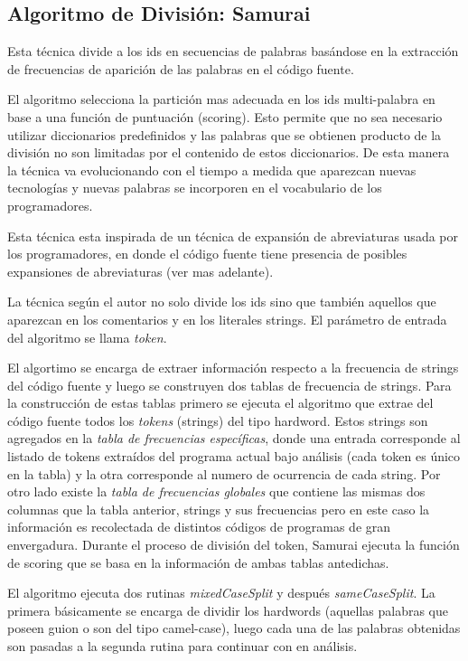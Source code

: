 \documentclass[12pt]{report}
\begin{document}
\subsection{Algoritmo de División: Samurai}

Esta técnica divide a los ids en secuencias de palabras basándose en la extracción de frecuencias de aparición de las palabras en el código fuente\cite{EHPV09}. 

El algoritmo selecciona la partición mas adecuada en los ids multi-palabra en base a una función de puntuación (scoring). Esto permite que no sea necesario utilizar diccionarios predefinidos y las palabras que se obtienen producto de la división no son limitadas por el contenido de estos diccionarios. De esta manera la técnica va evolucionando con el tiempo a medida que aparezcan nuevas tecnologías y nuevas palabras se incorporen en el vocabulario de los programadores.

Esta técnica esta inspirada de un técnica de expansión de abreviaturas usada por los programadores, en donde el código fuente tiene presencia de posibles expansiones de abreviaturas (ver mas adelante).%

La técnica según el autor\cite{EHPV09} no solo divide los ids sino que también aquellos que aparezcan en los comentarios y en los literales strings. El parámetro de entrada del algoritmo se llama \textit{token}.

El algortimo se encarga de extraer información respecto a la frecuencia de strings del código fuente y luego se construyen dos tablas de frecuencia de strings. Para la construcción de estas tablas primero se ejecuta el algoritmo que extrae del código fuente todos los \textit{tokens} (strings) del tipo hardword. Estos strings son agregados en la \textit{tabla de frecuencias específicas}, donde una entrada corresponde al listado de tokens extraídos del programa actual bajo análisis (cada token es único en la tabla) y la otra corresponde al numero de ocurrencia de cada string. Por otro lado existe la \textit{tabla de frecuencias globales} que contiene las mismas dos columnas que la tabla anterior, strings y sus frecuencias pero en este caso la información es recolectada de distintos códigos de programas de gran envergadura. Durante el proceso de división del token, Samurai ejecuta la función de scoring que se basa en la información de ambas tablas antedichas\cite{EHPV09}.

El algoritmo ejecuta dos rutinas \textit{mixedCaseSplit} y después \textit{sameCaseSplit}. La primera básicamente se encarga de dividir los hardwords (aquellas palabras que poseen guion o son del tipo camel-case), luego cada una de las palabras obtenidas son pasadas a la segunda rutina para continuar con en análisis\cite{EHPV09}.
\end{document}
